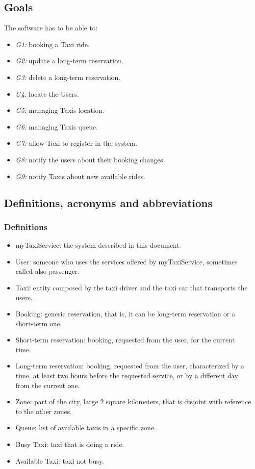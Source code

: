 	\subsection{Goals}
	The software has to be able to:
	\begin{itemize}
		\item \emph{G1:} booking a Taxi ride.
		\item \emph{G2:} update a long-term reservation.
		\item \emph{G3:} delete a long-term reservation.
		\item \emph{G4:} locate the Users.
		\item \emph{G5:} managing Taxis location.
		\item \emph{G6:} managing Taxis queue.
		\item \emph{G7:} allow Taxi to register in the system.
		\item \emph{G8:} notify the users about their booking changes.
		\item \emph{G9:} notify Taxis about new available rides.
	\end{itemize}
	
	\subsection{Definitions, acronyms and abbreviations}
		\subsubsection{Definitions}
		\begin{itemize}
			\item myTaxiService: the system described in this document.
			\item User: someone who uses the services offered by myTaxiService, sometimes called also passenger.
			\item Taxi: entity composed by the taxi driver and the taxi car that transports the users.
			\item Booking: generic reservation, that is, it can be long-term reservation or a short-term one.
			\item Short-term reservation: booking, requested from the user, for the current time.
			\item Long-term reservation: booking, requested from the user, characterized by a time, at least two hours before the requested service, or by a different day from the current one.
			\item Zone: part of the city, large 2 square kilometers, that is disjoint with reference to the other zones.
			\item Queue: list of available taxis in a specific zone.
			\item Busy Taxi: taxi that is doing a ride.
			\item Available Taxi: taxi not busy.
		\end{itemize}
